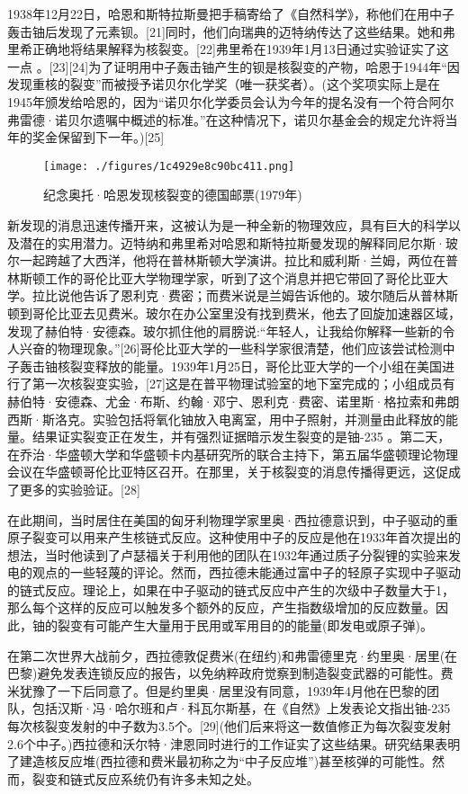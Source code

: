 1938年12月22日，哈恩和斯特拉斯曼把手稿寄给了《自然科学》，称他们在用中子轰击铀后发现了元素钡。[21]同时，他们向瑞典的迈特纳传达了这些结果。她和弗里希正确地将结果解释为核裂变。[22]弗里希在1939年1月13日通过实验证实了这一点 。[23][24]为了证明用中子轰击铀产生的钡是核裂变的产物，哈恩于1944年“因发现重核的裂变”而被授予诺贝尔化学奖（唯一获奖者）。(这个奖项实际上是在1945年颁发给哈恩的，因为“诺贝尔化学委员会认为今年的提名没有一个符合阿尔弗雷德·诺贝尔遗嘱中概述的标准。”在这种情况下，诺贝尔基金会的规定允许将当年的奖金保留到下一年。)[25]
\begin{figure}[ht]
\centering
\texttt{[image: ./figures/1c4929e8c90bc411.png]}
\caption{纪念奥托·哈恩发现核裂变的德国邮票(1979年)} \label{fig_HLB_10}
\end{figure}
新发现的消息迅速传播开来，这被认为是一种全新的物理效应，具有巨大的科学以及潜在的实用潜力。迈特纳和弗里希对哈恩和斯特拉斯曼发现的解释同尼尔斯·玻尔一起跨越了大西洋，他将在普林斯顿大学演讲。拉比和威利斯·兰姆，两位在普林斯顿工作的哥伦比亚大学物理学家，听到了这个消息并把它带回了哥伦比亚大学。拉比说他告诉了恩利克·费密；而费米说是兰姆告诉他的。玻尔随后从普林斯顿到哥伦比亚去见费米。玻尔在办公室里没有找到费米，他去了回旋加速器区域，发现了赫伯特·安德森。玻尔抓住他的肩膀说:“年轻人，让我给你解释一些新的令人兴奋的物理现象。”[26]哥伦比亚大学的一些科学家很清楚，他们应该尝试检测中子轰击铀核裂变释放的能量。1939年1月25日，哥伦比亚大学的一个小组在美国进行了第一次核裂变实验，[27]这是在普平物理试验室的地下室完成的；小组成员有赫伯特·安德森、尤金·布斯、约翰·邓宁、恩利克·费密、诺里斯·格拉索和弗朗西斯·斯洛克。实验包括将氧化铀放入电离室，用中子照射，并测量由此释放的能量。结果证实裂变正在发生，并有强烈证据暗示发生裂变的是铀-235 。第二天，在乔治·华盛顿大学和华盛顿卡内基研究所的联合主持下，第五届华盛顿理论物理会议在华盛顿哥伦比亚特区召开。在那里，关于核裂变的消息传播得更远，这促成了更多的实验验证。[28]

在此期间，当时居住在美国的匈牙利物理学家里奥·西拉德意识到，中子驱动的重原子裂变可以用来产生核链式反应。这种使用中子的反应是他在1933年首次提出的想法，当时他读到了卢瑟福关于利用他的团队在1932年通过质子分裂锂的实验来发电的观点的一些轻蔑的评论。然而，西拉德未能通过富中子的轻原子实现中子驱动的链式反应。理论上，如果在中子驱动的链式反应中产生的次级中子数量大于1，那么每个这样的反应可以触发多个额外的反应，产生指数级增加的反应数量。因此，铀的裂变有可能产生大量用于民用或军用目的的能量(即发电或原子弹)。

在第二次世界大战前夕，西拉德敦促费米(在纽约)和弗雷德里克·约里奥·居里(在巴黎)避免发表连锁反应的报告，以免纳粹政府觉察到制造裂变武器的可能性。费米犹豫了一下后同意了。但是约里奥·居里没有同意，1939年4月他在巴黎的团队，包括汉斯·冯·哈尔班和卢·科瓦尔斯基，在《自然》上发表论文指出铀-235每次核裂变发射的中子数为3.5个。[29](他们后来将这一数值修正为每次裂变发射2.6个中子。)西拉德和沃尔特·津恩同时进行的工作证实了这些结果。研究结果表明了建造核反应堆(西拉德和费米最初称之为“中子反应堆”)甚至核弹的可能性。然而，裂变和链式反应系统仍有许多未知之处。

